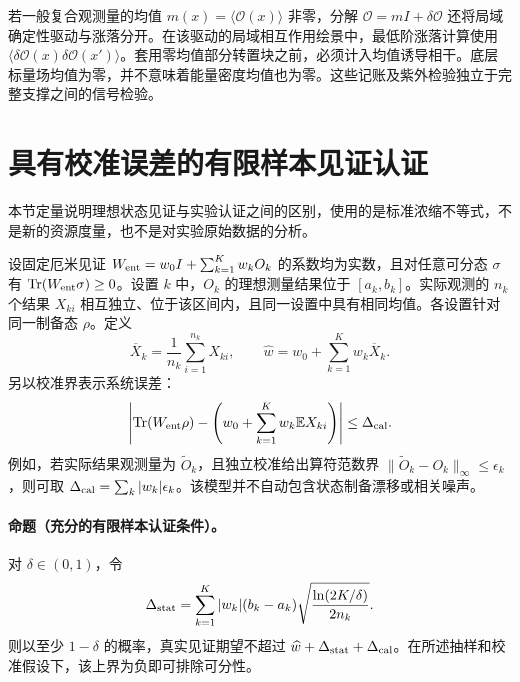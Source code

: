\documentclass[UTF8,11pt,a4paper,fontset=none]{ctexart}
\newcommand{\Tr}{\operatorname{Tr}}
\begin{document}
若一般复合观测量的均值 $m(x)=\langle\mathcal O(x)\rangle$ 非零，分解 $\mathcal O=mI+\delta\mathcal O$ 还将局域确定性驱动与涨落分开。在该驱动的局域相互作用绘景中，最低阶涨落计算使用 $\langle\delta\mathcal O(x)\delta\mathcal O(x')\rangle$。套用零均值部分转置块之前，必须计入均值诱导相干。底层标量场均值为零，并不意味着能量密度均值也为零。这些记账及紫外检验独立于完整支撑之间的信号检验。




\section{具有校准误差的有限样本见证认证}
\label{app:finite-sample}

本节定量说明理想状态见证与实验认证之间的区别，使用的是标准浓缩不等式，不是新的资源度量，也不是对实验原始数据的分析。

设固定厄米见证 $W_{\rm ent}=w_0I+\sum_{k=1}^K w_kO_k$ 的系数均为实数，且对任意可分态 $\sigma$ 有 $\Tr(W_{\rm ent}\sigma)\geq0$。设置 $k$ 中，$O_k$ 的理想测量结果位于 $[a_k,b_k]$。实际观测的 $n_k$ 个结果 $X_{ki}$ 相互独立、位于该区间内，且同一设置中具有相同均值。各设置针对同一制备态 $\rho$。定义
\begin{equation}
\overline X_k=\frac{1}{n_k}\sum_{i=1}^{n_k}X_{ki},\qquad
\widehat w=w_0+\sum_{k=1}^K w_k\overline X_k.
\label{eq:supp-witness-estimate}
\end{equation}
另以校准界表示系统误差：
\begin{equation}
\left|\Tr(W_{\rm ent}\rho)-
\left(w_0+\sum_{k=1}^Kw_k\mathbb E X_{ki}\right)\right|
\leq\Delta_{\rm cal}.
\label{eq:supp-calibration-bound}
\end{equation}
例如，若实际结果观测量为 $\widetilde O_k$，且独立校准给出算符范数界 $\|\widetilde O_k-O_k\|_\infty\leq\epsilon_k$，则可取 $\Delta_{\rm cal}=\sum_k|w_k|\epsilon_k$。该模型并不自动包含状态制备漂移或相关噪声。

\paragraph{命题（充分的有限样本认证条件）。}
对 $\delta\in(0,1)$，令
\begin{equation}
\Delta_{\rm stat}=\sum_{k=1}^K |w_k|(b_k-a_k)
\sqrt{\frac{\ln(2K/\delta)}{2n_k}}.
\label{eq:supp-witness-stat-error}
\end{equation}
则以至少 $1-\delta$ 的概率，真实见证期望不超过 $\widehat w+\Delta_{\rm stat}+\Delta_{\rm cal}$。在所述抽样和校准假设下，该上界为负即可排除可分性。
\end{document}

